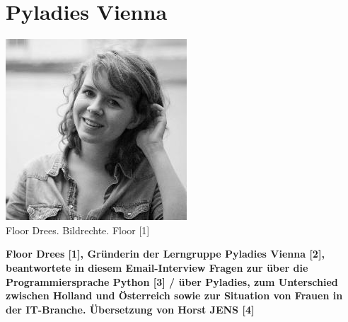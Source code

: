 \section*{Pyladies Vienna}
\label{floor}
\begin{center}
\includegraphics[width=\linewidth]{floor/floor.jpg} \\
\footnotesize{Floor Drees. Bildrechte. Floor [1]}
\end{center}
\textbf{Floor Drees [1], Gründerin der Lerngruppe Pyladies Vienna [2], beantwortete in diesem Email-Interview Fragen zur über die Programmiersprache Python [3] / über Pyladies, zum Unterschied zwischen Holland und Österreich sowie zur Situation von Frauen in der IT-Branche. Übersetzung von Horst JENS [4]} \\
